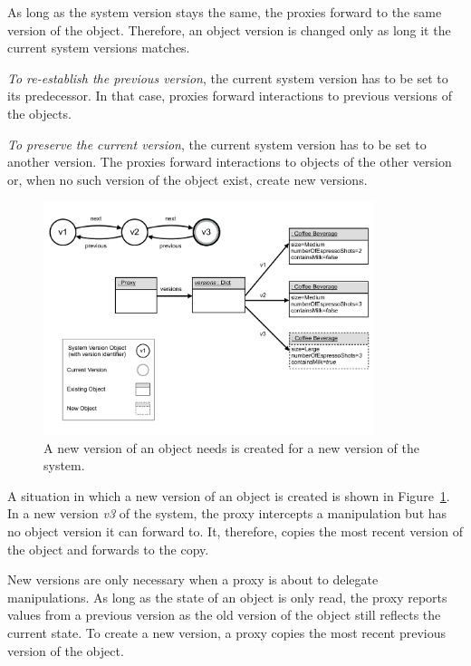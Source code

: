 As long as the system version stays the same, the proxies forward to the same version of the object.
Therefore, an object version is changed only as long it the current system versions matches.

\emph{To re-establish the previous version}, the current system version has to be set to its predecessor.
In that case, proxies forward interactions to previous versions of the objects.

\emph{To preserve the current version}, the current system version has to be set to another version.
The proxies forward interactions to objects of the other version or, when no such version of the object exist, create new versions.

\begin{figure}[h]
    \centering
    \includegraphics[width=0.86\textwidth]{figures/4_approach/10_newVersionOfAnObject.pdf}
    \caption{A new version of an object needs is created for a new version of the system.}
    \label{fig:NewVersion}
\end{figure}

A situation in which a new version of an object is created is shown in Figure~\ref{fig:NewVersion}.
In a new version \emph{v3} of the system, the proxy intercepts a manipulation but has no object version it can forward to.
It, therefore, copies the most recent version of the object and forwards to the copy.

New versions are only necessary when a proxy is about to delegate manipulations.
As long as the state of an object is only read, the proxy reports values from a previous version as the old version of the object still reflects the current state.
To create a new version, a proxy copies the most recent previous version of the object.


